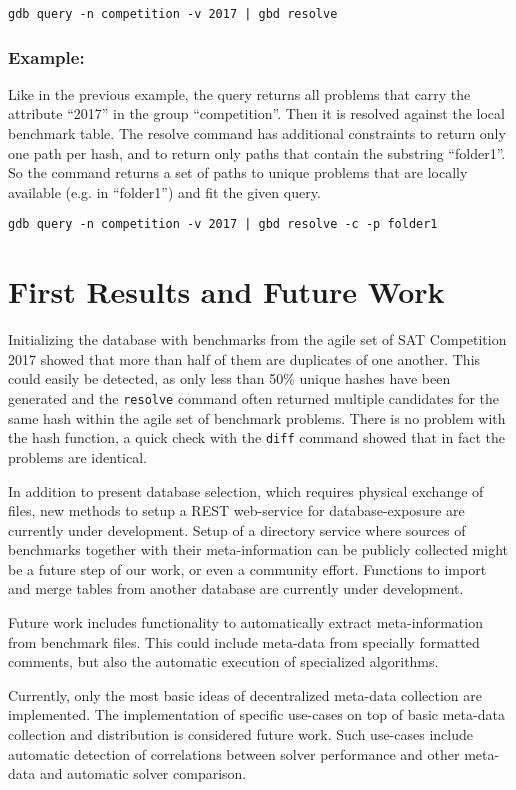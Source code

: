 \documentclass{easychair}
\begin{document}
\begin{verbatim}
gdb query -n competition -v 2017 | gbd resolve
\end{verbatim}

\subsubsection{Example:} Like in the previous example, the query returns all problems that carry the attribute ``2017'' in the group ``competition''. Then it is resolved against the local benchmark table. The resolve command has additional constraints to return only one path per hash, and to return only paths that contain the substring ``folder1''. So the command returns a set of paths to unique problems that are locally available (e.g. in ``folder1'') and fit the given query.

\begin{verbatim}
gdb query -n competition -v 2017 | gbd resolve -c -p folder1
\end{verbatim}


\section{First Results and Future Work}
\label{sec:conclusion}

Initializing the database with benchmarks from the agile set of SAT Competition 2017 showed that more than half of them are duplicates of one another. This could easily be detected, as only less than 50\% unique hashes have been generated and the \texttt{resolve} command often returned multiple candidates for the same hash within the agile set of benchmark problems. There is no problem with the hash function, a quick check with the \texttt{diff} command showed that in fact the problems are identical.

In addition to present database selection, which requires physical exchange of files, new methods to setup a REST web-service for database-exposure are currently under development.
Setup of a directory service where sources of benchmarks together with their meta-information can be publicly collected might be a future step of our work, or even a community effort. 
Functions to import and merge tables from another database are currently under development.

Future work includes functionality to automatically extract meta-information from benchmark files. 
This could include meta-data from specially formatted comments, 
but also the automatic execution of specialized algorithms. 

Currently, only the most basic ideas of decentralized meta-data collection are implemented. The implementation of specific use-cases on top of basic meta-data collection and distribution is considered future work. Such use-cases include automatic detection of correlations between solver performance and other meta-data and automatic solver comparison.




\end{document}

